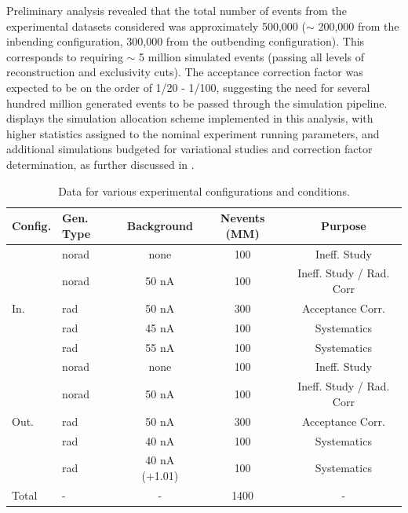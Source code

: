     Preliminary analysis revealed that the total number of \dvpip events from the experimental datasets considered was approximately 500,000 ($\sim$ 200,000 from the inbending configuration, 300,000 from the outbending configuration). This corresponds to requiring $\sim$ 5 million simulated events (passing all levels of reconstruction and exclusivity cuts). The acceptance correction factor was expected to be on the order of 1/20 - 1/100, suggesting the need for several hundred million generated events to be passed through the simulation pipeline.  displays the simulation allocation scheme implemented in this analysis, with higher statistics assigned to the nominal experiment running parameters, and additional simulations budgeted for variational studies and correction factor determination, as further discussed in .


    \iffalse
    \begin{table}[h]
        \centering
        \begin{tabular}{l|lccc}
            \textbf{Config.} & \textbf{Gen. Type} & \textbf{Background} & \textbf{Nevents (MM)} & \textbf{Purpose} \\ \hline
                & norad & none & 100 & Ineff. Study \\
                & norad & 50 nA & 100 & Ineff. Study / Rad. Corr \\
            In. & rad & 50 nA & 300 & Acceptance Corr. \\
                & rad & 45 nA & 100 & Systematics \\
                & rad & 55 nA & 100 & Systematics \\ \hline
                & norad & none & 100 & Ineff. Study \\
                & norad &  50 nA & 100 & Ineff. Study / Rad. Corr \\
            Out. & rad & 50 nA & 300 & Acceptance Corr. \\
                 & rad & 40 nA & 100 & Systematics \\
             & rad & 40 nA (+1.01) & 100 & Systematics \\
            \hline
            Total & - & - & 1400 & - \\
        \end{tabular}
    \caption{Data for various experimental configurations and conditions.}
    \label{table:experiments}
    \end{table}
    
